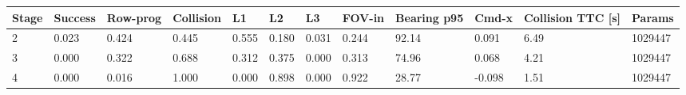\begin{tabular}{llllllllllll}
\toprule
Stage & Success & Row-prog & Collision & L1 & L2 & L3 & FOV-in & Bearing p95 & Cmd-x & Collision TTC [s] & Params \\
\midrule
2 & 0.023 & 0.424 & 0.445 & 0.555 & 0.180 & 0.031 & 0.244 & 92.14 & 0.091 & 6.49 & 1029447 \\
3 & 0.000 & 0.322 & 0.688 & 0.312 & 0.375 & 0.000 & 0.313 & 74.96 & 0.068 & 4.21 & 1029447 \\
4 & 0.000 & 0.016 & 1.000 & 0.000 & 0.898 & 0.000 & 0.922 & 28.77 & -0.098 & 1.51 & 1029447 \\
\bottomrule
\end{tabular}
